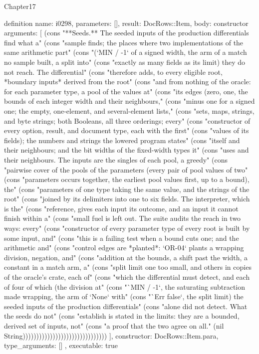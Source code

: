 \begin{lexlean}{Chapter17}
\begin{semanticmodule}
definition{
  name: i0298,
  parameters: [],
  result: DocRows::Item,
  body: constructor{
    arguments: [
      (cons "**Seeds.** The seeded inputs of the production differentials find what a" (cons "sample finds; the places where two implementations of the same arithmetic part" (cons "(`MIN / -1` of a signed width, the arm of a match no sample built, a split into" (cons "exactly as many fields as its limit) they do not reach. The differential" (cons "therefore adds, to every eligible root, *boundary inputs* derived from the root" (cons "and from nothing of the oracle: for each parameter type, a pool of the values at" (cons "its edges (zero, one, the bounds of each integer width and their neighbours," (cons "minus one for a signed one; the empty, one-element, and several-element lists," (cons "sets, maps, strings, and byte strings; both Booleans, all three orderings; every" (cons "constructor of every option, result, and document type, each with the first" (cons "values of its fields); the numbers and strings the lowered program states" (cons "itself and their neighbours; and the bit widths of the fixed-width types it" (cons "uses and their neighbours. The inputs are the singles of each pool, a greedy" (cons "pairwise cover of the pools of the parameters (every pair of pool values of two" (cons "parameters occurs together, the earliest pool values first, up to a bound), the" (cons "parameters of one type taking the same value, and the strings of the root" (cons "joined by its delimiters into one to six fields. The interpreter, which is the" (cons "reference, gives each input its outcome, and an input it cannot finish within a" (cons "small fuel is left out. The suite audits the reach in two ways: every" (cons "constructor of every parameter type of every root is built by some input, and" (cons "this is a failing test when a bound cuts one; and the arithmetic and" (cons "control edges are *planted*: `OR-04` plants a wrapping division, negation, and" (cons "addition at the bounds, a shift past the width, a constant in a match arm, a" (cons "split limit one too small, and others in copies of the oracle's crate, each of" (cons "which the differential must detect, and each of four of which (the division at" (cons "`MIN / -1`, the saturating subtraction made wrapping, the arm of `None` with" (cons "`Err false`, the split limit) the seeded inputs of the production differentials" (cons "alone did not detect. What the seeds do not" (cons "establish is stated in the limits: they are a bounded, derived set of inputs, not" (cons "a proof that the two agree on all." (nil String)))))))))))))))))))))))))))))))
    ],
    constructor: DocRows::Item.para,
    type_arguments: []
  },
  executable: true
}


\end{semanticmodule}
\end{lexlean}
